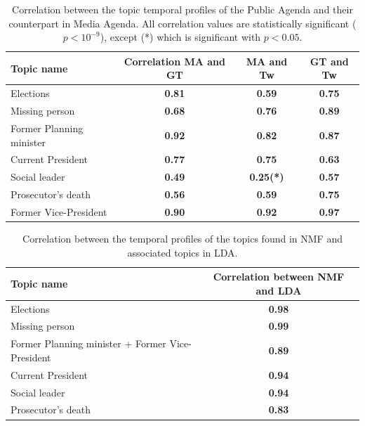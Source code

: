\documentclass{bmcart}
\begin{document}
\begin{backmatter}
\begin{table}[h!]
\caption{Correlation between the topic temporal profiles of the Public Agenda and their counterpart in Media Agenda.
All correlation values are statistically significant ($p < 10^{-9}$), except (*) which is significant with $p < 0.05$.}
\begin{tabular}{lccc}
Topic name & Correlation MA and GT & MA and Tw & GT and Tw \\ \hline
Elections & \textbf{0.81} & \textbf{0.59} & \textbf{0.75} \\
Missing person & \textbf{0.68} & \textbf{0.76} & \textbf{0.89} \\
Former Planning minister & \textbf{0.92} & \textbf{0.82} & \textbf{0.87} \\
Current President & \textbf{0.77} & \textbf{0.75} & \textbf{0.63} \\
Social leader & \textbf{0.49} & \textbf{0.25(*)} & \textbf{0.57} \\
Prosecutor's death & \textbf{0.56} & \textbf{0.59} & \textbf{0.75} \\
Former Vice-President & \textbf{0.90} & \textbf{0.92} & \textbf{0.97}\\
\end{tabular}
\label{table:gt_all_correlation}
\end{table}

\begin{table}[h!]
\caption{Correlation between the temporal profiles of the topics found in NMF and associated topics in LDA.}
\begin{tabular}{lc}
Topic name & Correlation between NMF and LDA \\ \hline
Elections & \textbf{0.98} \\
Missing person & \textbf{0.99} \\
Former Planning minister + Former Vice-President & \textbf{0.89} \\
Current President & \textbf{0.94} \\
Social leader & \textbf{0.94} \\
Prosecutor's death & \textbf{0.83} \\
\end{tabular}
\label{table:correlation_nmf_lda}
\end{table}




\end{backmatter}
\end{document}
